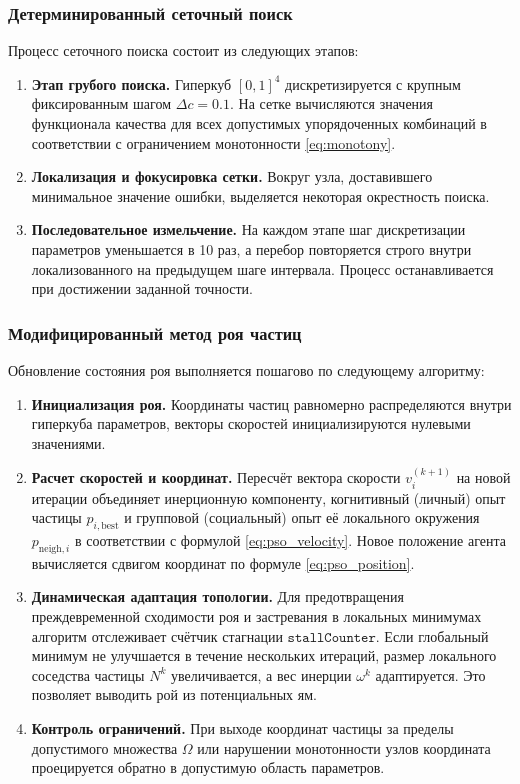 \subsubsection{Детерминированный сеточный поиск}
Процесс сеточного поиска состоит из следующих этапов:
\begin{enumerate}
	\item \textbf{Этап грубого поиска.} Гиперкуб $[0, 1]^4$ дискретизируется с крупным фиксированным шагом $\Delta c = 0.1$. На сетке вычисляются значения функционала качества для всех допустимых упорядоченных комбинаций в соответствии с ограничением монотонности \eqref{eq:monotony}.
	\item \textbf{Локализация и фокусировка сетки.} Вокруг узла, доставившего минимальное значение ошибки, выделяется некоторая окрестность поиска.
	\item \textbf{Последовательное измельчение.} На каждом этапе шаг дискретизации параметров уменьшается в 10 раз, а перебор повторяется строго внутри локализованного на предыдущем шаге интервала. Процесс останавливается при достижении заданной точности.
\end{enumerate}

\subsubsection{Модифицированный метод роя частиц}
Обновление состояния роя выполняется пошагово по следующему алгоритму:
\begin{enumerate}
	\item \textbf{Инициализация роя.} Координаты частиц равномерно распределяются внутри гиперкуба параметров, векторы скоростей инициализируются нулевыми значениями.
	\item \textbf{Расчет скоростей и координат.} Пересчёт вектора скорости $v_i^{(k+1)}$ на новой итерации объединяет инерционную компоненту, когнитивный (личный) опыт частицы $p_{i,\text{best}}$ и групповой (социальный) опыт её локального окружения $p_{\text{neigh},i}$ в соответствии с формулой \eqref{eq:pso_velocity}. Новое положение агента вычисляется сдвигом координат по формуле \eqref{eq:pso_position}.
	\item \textbf{Динамическая адаптация топологии.} Для предотвращения преждевременной сходимости роя и застревания в локальных минимумах алгоритм отслеживает счётчик стагнации $\texttt{stallCounter}$. Если глобальный минимум не улучшается в течение нескольких итераций, размер локального соседства частицы $N^k$ увеличивается, а вес инерции $\omega^k$ адаптируется. Это позволяет выводить рой из потенциальных ям.
	\item \textbf{Контроль ограничений.} При выходе координат частицы за пределы допустимого множества $\Omega$ или нарушении монотонности узлов  координата проецируется обратно в допустимую область параметров.
\end{enumerate}

